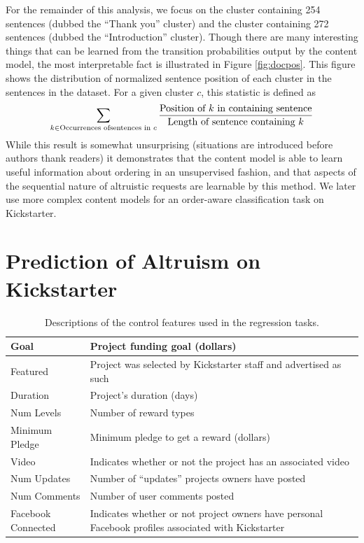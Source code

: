 \documentclass[letterpaper]{article}
\begin{document}
For the remainder of this analysis, we focus on the cluster containing 254 sentences (dubbed the ``Thank you'' cluster) and the cluster containing 272 sentences (dubbed the ``Introduction'' cluster). Though there are many interesting things that can be learned from the transition probabilities output by the content model, the most interpretable fact is illustrated in Figure \ref{fig:docpos}. This figure shows the distribution of normalized sentence position of each cluster in the sentences in the dataset. For a given cluster $c$, this statistic is defined as
\begin{equation} \label{eq:sentpos}
\sum\limits_{k \in \text{Occurrences of\\sentences in $c$}} \frac{\text{Position of $k$ in containing sentence}}{\text{Length of sentence containing $k$}}
\end{equation}
While this result is somewhat unsurprising (situations are introduced before authors thank readers) it demonstrates that the content model is able to learn useful information about ordering in an unsupervised fashion, and that aspects of the sequential nature of altruistic requests are learnable by this method. We later use more complex content models for an order-aware classification task on Kickstarter.
\section{Prediction of Altruism on Kickstarter}
\begin{table}
\centering
\begin{tabular}{|l|L{5cm}|}
\hline
Goal & Project funding goal (dollars) \\\hline
Featured & Project was selected by Kickstarter staff and advertised as such\\\hline
Duration & Project's duration (days) \\\hline
Num Levels & Number of reward types \\\hline
Minimum Pledge & Minimum pledge to get a reward (dollars)\\\hline
Video & Indicates whether or not the project has an associated video \\\hline
Num Updates & Number of ``updates'' projects owners have posted \\\hline
Num Comments & Number of user comments posted \\\hline
Facebook Connected & Indicates whether or not project owners have personal Facebook profiles associated with Kickstarter\\
\hline
\end{tabular}
\caption{Descriptions of the control features used in the regression tasks.}
\label{tab:controls}
\end{table}
\end{document}
